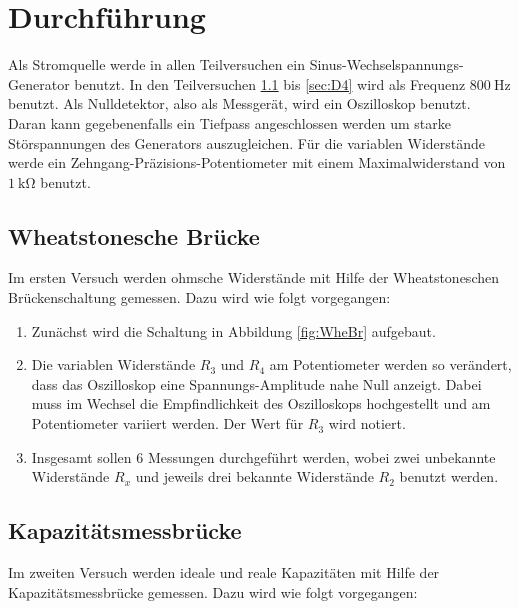 \newpage

 \section{Durchführung}
\label{sec:Durchführung}

Als Stromquelle werde in allen Teilversuchen ein
Sinus-Wechselspannungs-Generator benutzt. In den Teilversuchen \ref{sec:D1}
bis \ref{sec:D4} wird als Frequenz $\SI{800}{\Hz}$ benutzt.
Als Nulldetektor, also als Messgerät, wird ein Oszilloskop benutzt. Daran
kann gegebenenfalls ein Tiefpass angeschlossen werden um starke Störspannungen
des Generators auszugleichen.
Für die variablen Widerstände werde ein Zehngang-Präzisions-Potentiometer
mit einem Maximalwiderstand von $\SI{1}{\kilo\ohm}$ benutzt.


\subsection{Wheatstonesche Brücke}
\label{sec:D1}

Im ersten Versuch werden ohmsche Widerstände mit Hilfe der Wheatstoneschen
Brückenschaltung gemessen. Dazu wird wie folgt vorgegangen:

\begin{enumerate}

\item Zunächst wird die Schaltung in Abbildung \ref{fig:WheBr} aufgebaut.

\item Die variablen Widerstände $R_3$ und $R_4$ am Potentiometer werden so
verändert, dass das Oszilloskop eine Spannungs-Amplitude nahe Null anzeigt.
Dabei muss im Wechsel die Empfindlichkeit des Oszilloskops hochgestellt
und am Potentiometer variiert werden. Der Wert für $R_3$ wird notiert.

\item Insgesamt sollen 6 Messungen durchgeführt werden, wobei zwei unbekannte
Widerstände $R_x$ und jeweils drei bekannte Widerstände $R_2$ benutzt werden.

\end{enumerate}


\subsection{Kapazitätsmessbrücke}

Im zweiten Versuch werden ideale und reale Kapazitäten mit Hilfe
der Kapazitätsmessbrücke gemessen. Dazu wird wie folgt vorgegangen:


